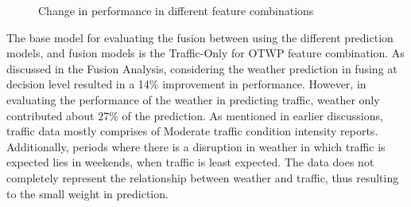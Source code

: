 \begin{figure}
  \centering
  \captionsetup{justification=centering}
  \caption{Change in performance in different feature combinations}
  \label{fig:pm1-pm2-df-changes}
\end{figure}


The base model for evaluating the fusion between using the different prediction models, and fusion models is the Traffic-Only for OTWP feature combination. As discussed in the Fusion Analysis, considering the weather prediction in fusing at decision level resulted in a 14\% improvement in performance. However, in evaluating the performance of the weather in predicting traffic, weather only contributed about 27\% of the prediction. As mentioned in earlier discussions, traffic data mostly comprises of Moderate traffic condition intensity reports. Additionally, periods where there is a disruption in weather in which traffic is expected lies in weekends, when traffic is least expected. The data does not completely represent the relationship between weather and traffic, thus resulting to the small weight in prediction. 
